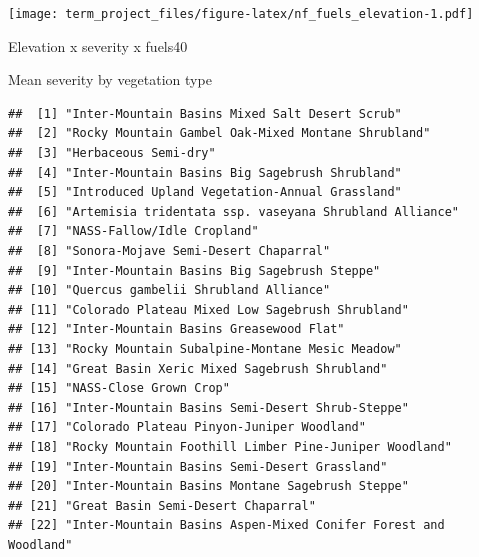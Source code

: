 \documentclass[]{book}
\newenvironment{Shaded}{\begin{snugshade}}{\end{snugshade}}
\newcommand{\KeywordTok}[1]{\textcolor[rgb]{0.13,0.29,0.53}{\textbf{#1}}}
\newcommand{\NormalTok}[1]{#1}
\newcommand{\OperatorTok}[1]{\textcolor[rgb]{0.81,0.36,0.00}{\textbf{#1}}}
\newcommand{\StringTok}[1]{\textcolor[rgb]{0.31,0.60,0.02}{#1}}
\begin{document}
\texttt{[image: term\_project\_files/figure-latex/nf\_fuels\_elevation-1.pdf]}

Elevation x severity x fuels40

Mean severity by vegetation type

\begin{Shaded}
\end{Shaded}

\begin{verbatim}
##  [1] "Inter-Mountain Basins Mixed Salt Desert Scrub"                              
##  [2] "Rocky Mountain Gambel Oak-Mixed Montane Shrubland"                          
##  [3] "Herbaceous Semi-dry"                                                        
##  [4] "Inter-Mountain Basins Big Sagebrush Shrubland"                              
##  [5] "Introduced Upland Vegetation-Annual Grassland"                              
##  [6] "Artemisia tridentata ssp. vaseyana Shrubland Alliance"                      
##  [7] "NASS-Fallow/Idle Cropland"                                                  
##  [8] "Sonora-Mojave Semi-Desert Chaparral"                                        
##  [9] "Inter-Mountain Basins Big Sagebrush Steppe"                                 
## [10] "Quercus gambelii Shrubland Alliance"                                        
## [11] "Colorado Plateau Mixed Low Sagebrush Shrubland"                             
## [12] "Inter-Mountain Basins Greasewood Flat"                                      
## [13] "Rocky Mountain Subalpine-Montane Mesic Meadow"                              
## [14] "Great Basin Xeric Mixed Sagebrush Shrubland"                                
## [15] "NASS-Close Grown Crop"                                                      
## [16] "Inter-Mountain Basins Semi-Desert Shrub-Steppe"                             
## [17] "Colorado Plateau Pinyon-Juniper Woodland"                                   
## [18] "Rocky Mountain Foothill Limber Pine-Juniper Woodland"                       
## [19] "Inter-Mountain Basins Semi-Desert Grassland"                                
## [20] "Inter-Mountain Basins Montane Sagebrush Steppe"                             
## [21] "Great Basin Semi-Desert Chaparral"                                          
## [22] "Inter-Mountain Basins Aspen-Mixed Conifer Forest and Woodland"              

\end{verbatim}
\end{document}
